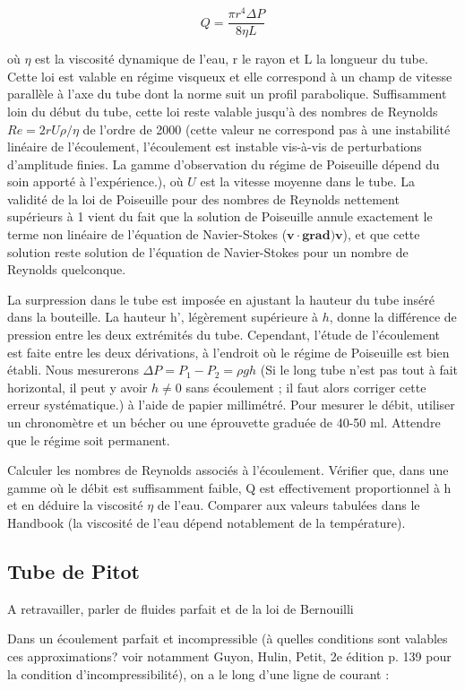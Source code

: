 \documentclass{article}%
\begin{document}
\[ Q = \frac{\pi r^4 \Delta P}{8 \eta L}\]

où $\eta$ est la viscosité dynamique de l'eau, r le rayon et L la longueur du tube. Cette loi est valable en régime visqueux et elle correspond à un champ de vitesse parallèle à l'axe du tube dont la norme suit un profil parabolique. Suffisamment loin du début du tube, cette loi reste valable jusqu'à des nombres de Reynolds $Re=2 r U \rho/ \eta$ de l'ordre de 2000 (cette valeur ne correspond pas à une instabilité linéaire de l'écoulement, l'écoulement est instable vis-à-vis de perturbations d'amplitude finies. La gamme d'observation du régime de Poiseuille dépend du soin apporté à l'expérience.), où $U$ est la vitesse moyenne dans le tube. La validité de la loi de Poiseuille pour des nombres de Reynolds nettement supérieurs à 1 vient du fait que la solution de Poiseuille annule exactement le terme non linéaire de l'équation de Navier-Stokes ($\mathbf{v}\cdot\mathbf{grad})\mathbf{v}$), et que cette solution reste solution de l'équation de Navier-Stokes pour un nombre de Reynolds quelconque.

La surpression dans le tube est imposée en ajustant la hauteur du tube inséré dans la bouteille. La hauteur {h}', légèrement supérieure à $h$, donne la différence de pression entre les deux extrémités du tube. Cependant, l'étude de l'écoulement est faite entre les deux dérivations, à l'endroit où le régime de Poiseuille est bien établi. Nous mesurerons $\Delta P = P_1 - P_2 = \rho g h$ (Si le long tube n'est pas tout à fait horizontal, il peut y avoir $h\neq 0$ sans écoulement ; il faut alors corriger cette erreur systématique.) à l'aide de papier millimétré. Pour mesurer le débit, utiliser un chronomètre et un bécher ou une éprouvette graduée de 40-50 ml. Attendre que le régime soit permanent.

Calculer les nombres de Reynolds associés à l'écoulement. Vérifier que, dans une gamme où le débit est suffisamment faible, Q est effectivement proportionnel à h et en déduire la viscosité $\eta$ de l'eau. Comparer aux valeurs tabulées dans le Handbook (la viscosité de l'eau dépend notablement de la température). 


\subsection{Tube de Pitot}
A retravailler, parler de fluides parfait et de la loi de Bernouilli

Dans un écoulement parfait et incompressible (à quelles conditions sont valables ces approximations? voir notamment Guyon, Hulin, Petit, 2e édition p. 139 pour la condition d'incompressibilité), on a le long d'une ligne de courant :
\end{document}
